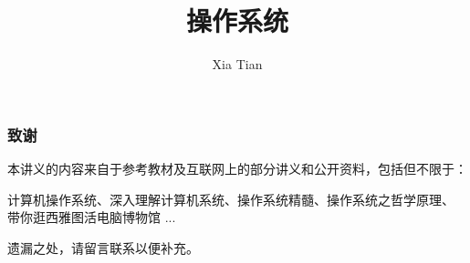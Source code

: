 \documentclass[table, 13pt, slidestop,compress,mathserif]{beamer}
\title{操作系统}
\author{Xia Tian }
\institute{Renmin University of China }
\begin{document}
\frame{\titlepage}

%

%
%
%
% 

\begin{frame}[fragile]
  \frametitle{致谢}

  本讲义的内容来自于参考教材及互联网上的部分讲义和公开资料，包括但不限于：

  计算机操作系统、深入理解计算机系统、操作系统精髓、操作系统之哲学原理、
  带你逛西雅图活电脑博物馆 ...

  遗漏之处，请留言联系以便补充。
\end{frame}
\end{document}
